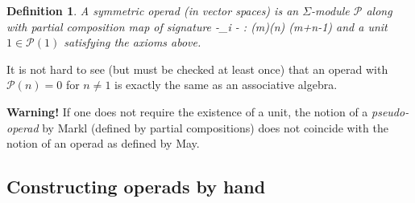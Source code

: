 \documentclass[fleqn, a4paper, twoside]{article}
\makeatletter
\newcommand{\0}{\langle 0\rangle}
\let\[\@undefined
\DeclareRobustCommand{\[}{\begin{equation}}%
\let\]\@undefined
\DeclareRobustCommand{\]}{\end{equation}}%
\theoremstyle{mytheorem}
\theoremstyle{introthm}
\theoremstyle{mydefinition}
\newtheorem{definition}[theorem]{Definition}
\theoremstyle{mydefinition2}
\theoremstyle{plain} %
\newcommand{\?}{\,?\,}
\newcommand{\PP}{{\mathcal{P}}}
\theoremstyle{mytheorem}
\theoremstyle{plain} %
\makeatother
\begin{document}
\begin{definition}
A symmetric operad (in vector spaces) is an
$\Sigma$-module $\PP$ along with partial composition
map of signature
\[ -\circ_i -  : \PP(m)\otimes \PP(n) 
	\longrightarrow \PP(m+n-1) \]
and a unit $1\in\PP(1)$ satisfying the axioms above.
\end{definition}

It is not hard to see (but must be checked at least once)
that an operad with $\PP(n) = 0$ for $n\neq 1$ is
exactly the same as an associative algebra. 

\textbf{Warning!} If one does not require
the existence of a unit, the notion of a
\emph{pseudo-operad} by Markl (defined by partial
compositions) does not coincide with the
notion of an operad as defined by May.


\subsection{Constructing operads by hand}
\end{document}
